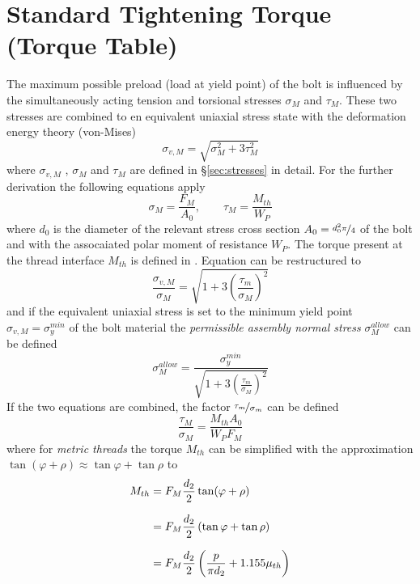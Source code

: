 \chapter{Standard Tightening Torque (Torque Table)}
The maximum possible preload (load at yield point) of the bolt is influenced by the simultaneously acting 
tension and torsional stresses $\sigma_M$ and $\tau_M$. These two stresses are combined to en equivalent 
uniaxial stress state with the deformation energy theory (von-Mises)
\begin{equation}
    \sigma_{v,M} = \sqrt{\sigma_M^2 + 3 \tau_M^2}
    \label{equ:sig_vM_2}
\end{equation}
where $\sigma_{v,M}$ , $\sigma_M$  and $\tau_M$  
are defined in §\ref{sec:stresses} in detail. For the further derivation the following equations apply 
\begin{equation}
    \sigma_M = \frac{F_M}{A_0}, \qquad \tau_M = \frac{M_{th}}{W_P}
    \label{equ:sig_tau}
\end{equation}
where $d_0$ is the diameter of the relevant stress cross section $A_0=\nicefrac{d_0^2 \pi}{4}$ of the
bolt and with the assocaiated polar moment of resistance $W_P$. The torque present at the thread 
interface $M_{th}$ is defined in . Equation  can be restructured to
\begin{equation}
    \frac{\sigma_{v,M}}{\sigma_M} = \sqrt{1+3\left(\frac{\tau_m}{\sigma_M}\right)^2}
\end{equation}
and if the equivalent uniaxial stress is set to the minimum yield point $\sigma_{v,M}=\sigma_y^{min}$ 
of the bolt material the \emph{permissible assembly normal stress} $\sigma_M^{allow}$ can be defined
\begin{equation}
    \sigma_M^{allow} = \frac{\sigma_y^{min}}{\sqrt{1+3\left(\frac{\tau_m}{\sigma_M}\right)^2}}
\end{equation}
If the two equations  are combined, the factor $\nicefrac{\tau_m}{\sigma_m}$ can be defined 
\begin{equation}
    \frac{\tau_M}{\sigma_M} = \frac{M_{th} A_0}{W_P F_M}
\end{equation}
where for \emph{metric threads} the torque $M_{th}$ can be simplified with the approximation 
$\tan(\varphi + \rho) \approx \tan\varphi + \tan\rho$ to
\begin{subequations}
    \setlength{\jot}{10pt}
    \begin{align}
        M_{th} &= F_M \frac{d_2}{2} \tan(\varphi+\rho) \\
        &= F_M \frac{d_2}{2} \left( \tan\varphi + \tan\rho \right) \\
        &= F_M \frac{d_2}{2} \left( \frac{p}{\pi d_2} + 1.155 \mu_{th} \right)
    \end{align}
\end{subequations}

